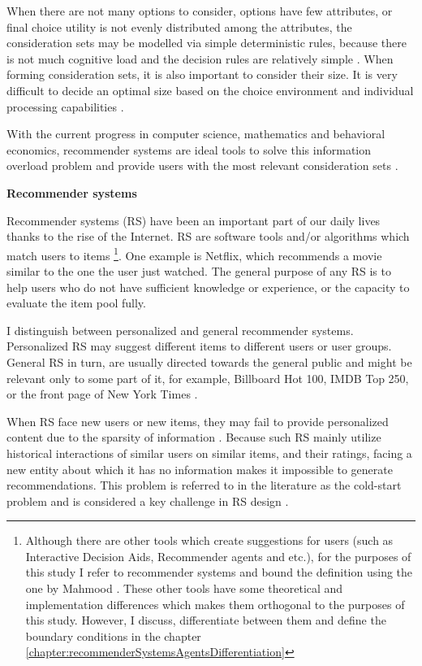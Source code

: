 \documentclass[a4paper,12pt]{article}
\newcommand{\citeyearonly}[1]{\citeyearpar{#1}}
\begin{document}
When there are not many options to consider, options have few attributes, or final choice utility is not evenly distributed among the attributes, the consideration sets may be modelled via simple deterministic rules, because there is not much cognitive load and the decision rules are relatively simple  \citep{hauser2014consideration, lee2004effect} . When forming consideration sets, it is also important to consider their size. It is very difficult to decide an optimal size based on the choice environment and individual processing capabilities \citep{de2011modelling}. 

With the current progress in computer science, mathematics and behavioral economics, recommender systems are ideal tools to solve this information overload problem and provide users with the most relevant consideration sets \citep{breese2013empirical}.

    
\textbf{Recommender systems}    

Recommender systems (RS) have been an important part of our daily lives thanks to the rise of the Internet. RS are software tools and/or algorithms which match users to items \citep{mahmood2009improving} \footnote{Although there are other tools which create suggestions for users (such as Interactive Decision Aids, Recommender agents and etc.), for the purposes of this study I refer to recommender systems and bound the definition using the one by Mahmood \citeyearonly{mahmood2009improving}. These other tools have some theoretical and implementation differences which makes them orthogonal to the purposes of this study. However, I discuss, differentiate between them and define the boundary conditions in the chapter \ref{chapter:recommenderSystemsAgentsDifferentiation}}. One example is Netflix, which recommends a movie similar to the one the user just watched. The general purpose of any RS is to help users who do not have sufficient knowledge or experience, or the capacity to evaluate the item pool fully. 

I distinguish between personalized and general recommender systems. Personalized RS  may suggest different items to different users or user groups. General RS in turn, are usually directed towards the general public and might be relevant only to some part of it, for example, Billboard Hot 100, IMDB Top 250, or the front page of New York Times \citep{ricci2010recsystems}.

When RS face new users or new items, they may fail to provide personalized content due to the sparsity of information \citep{lika2014facing}. Because such RS mainly utilize historical interactions of similar users on similar items, and their ratings, facing a new entity about which it has no information makes it impossible to generate recommendations. This problem is referred to in the literature as the cold-start problem \citep{adomavicius2005toward} and is considered a key challenge in RS design \citep{park2009pairwise}.
\end{document}
